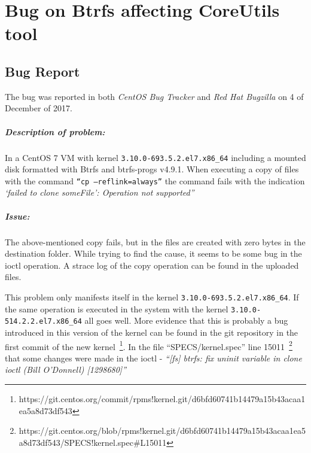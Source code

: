 \chapter{Bug on Btrfs affecting CoreUtils tool}
\label{ann:bug}

\section{Bug Report}
\label{sec:bug_report}

The bug was reported in both \textit{CentOS Bug Tracker} and \textit{Red Hat Bugzilla} on 4 of December of 2017.

\paragraph{Description of problem:}

In a CentOS 7 VM with kernel \texttt{3.10.0-693.5.2.el7.x86\_64} including a mounted disk formatted with Btrfs and btrfs-progs v4.9.1.
When executing a copy of files with the command \texttt{``cp --reflink=always''} the command fails with the indication \textit{`failed to clone someFile': Operation not supported''}

\paragraph{Issue:}

The above-mentioned copy fails, but in the files are created with zero bytes in the destination folder.
While trying to find the cause, it seems to be some bug in the ioctl operation. A strace log of the copy operation can be found in the uploaded files.

This problem only manifests itself in the kernel \texttt{3.10.0-693.5.2.el7.x86\_64}. If the same operation is executed in the system with the kernel \texttt{3.10.0-514.2.2.el7.x86\_64} all goes well.
More evidence that this is probably a bug introduced in this version of the kernel can be found in the git repository in the first commit of the new kernel~\footnote{https://git.centos.org/commit/rpms!kernel.git/d6bfd60741b14479a15b43acaa1ea5a8d73df543}.
In the file ``SPECS/kernel.spec'' line 15011~\footnote{https://git.centos.org/blob/rpms!kernel.git/d6bfd60741b14479a15b43acaa1ea5a8d73df543/SPECS!kernel.spec\#L15011} that some changes were made in the ioctl - \textit{``[fs] btrfs: fix uninit variable in clone ioctl (Bill O'Donnell) [1298680]''}

